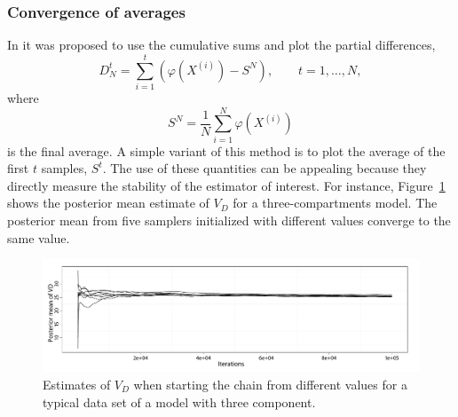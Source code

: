 \subsubsection{Convergence of averages}
\label{ssub:Convergence of averages}

In \cite{Yu:1998fn} it was proposed to use the cumulative sums and plot the
partial differences,
\begin{equation}
  D_N^t = \sum_{i=1}^t (\varphi(X^{(i)}) - S^N), \qquad t = 1,\dots,N,
\end{equation}
where
\begin{equation}
  S^N = \frac{1}{N}\sum_{i=1}^N \varphi(X^{(i)})
\end{equation}
is the final average. A simple variant of this method is to plot the average
of the first $t$ samples, $S^t$. The use of these quantities can be appealing
because they directly measure the stability of the estimator of interest. For
instance, Figure~\ref{fig:pet vd mean} shows the posterior mean estimate of
$V_D$ for a three-compartments \pet model. The posterior mean from five
samplers initialized with different values converge to the same value.

\begin{figure}
  \includegraphics[width=\linewidth]{fig/PET_VD}
  \caption{Estimates of $V_D$ when starting the \mcmc chain from different
    values for a typical data set of a \pet model with three component.}
  \label{fig:pet vd mean}
\end{figure}

